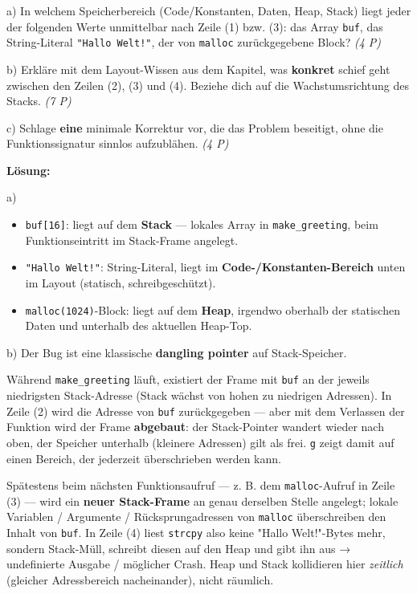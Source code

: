 \documentclass[11pt, a4paper]{article}
\begin{document}
a) In welchem Speicherbereich (Code/Konstanten, Daten, Heap, Stack) liegt jeder der folgenden Werte unmittelbar nach Zeile (1) bzw. (3): das Array \texttt{buf}, das String-Literal \texttt{"Hallo Welt!"}, der von \texttt{malloc} zurückgegebene Block? \textit{(4 P)}


b) Erkläre mit dem Layout-Wissen aus dem Kapitel, was \textbf{konkret} schief geht zwischen den Zeilen (2), (3) und (4). Beziehe dich auf die Wachstumsrichtung des Stacks. \textit{(7 P)}


c) Schlage \textbf{eine} minimale Korrektur vor, die das Problem beseitigt, ohne die Funktionssignatur sinnlos aufzublähen. \textit{(4 P)}


\textbf{Lösung:}


a)

\begin{itemize}
  \item \texttt{buf[16]}: liegt auf dem \textbf{Stack} — lokales Array in \texttt{make\_greeting}, beim Funktionseintritt im Stack-Frame angelegt.
  \item \texttt{"Hallo Welt!"}: String-Literal, liegt im \textbf{Code-/Konstanten-Bereich} unten im Layout (statisch, schreibgeschützt).
  \item \texttt{malloc(1024)}-Block: liegt auf dem \textbf{Heap}, irgendwo oberhalb der statischen Daten und unterhalb des aktuellen Heap-Top.
\end{itemize}

b) Der Bug ist eine klassische \textbf{dangling pointer} auf Stack-Speicher.

Während \texttt{make\_greeting} läuft, existiert der Frame mit \texttt{buf} an der jeweils niedrigsten Stack-Adresse (Stack wächst von hohen zu niedrigen Adressen). In Zeile (2) wird die Adresse von \texttt{buf} zurückgegeben — aber mit dem Verlassen der Funktion wird der Frame \textbf{abgebaut}: der Stack-Pointer wandert wieder nach oben, der Speicher unterhalb (kleinere Adressen) gilt als frei. \texttt{g} zeigt damit auf einen Bereich, der jederzeit überschrieben werden kann.

Spätestens beim nächsten Funktionsaufruf — z. B. dem \texttt{malloc}-Aufruf in Zeile (3) — wird ein \textbf{neuer Stack-Frame} an genau derselben Stelle angelegt; lokale Variablen / Argumente / Rücksprungadressen von \texttt{malloc} überschreiben den Inhalt von \texttt{buf}. In Zeile (4) liest \texttt{strcpy} also keine "Hallo Welt!"-Bytes mehr, sondern Stack-Müll, schreibt diesen auf den Heap und gibt ihn aus → undefinierte Ausgabe / möglicher Crash. Heap und Stack kollidieren hier \textit{zeitlich} (gleicher Adressbereich nacheinander), nicht räumlich.
\end{document}

